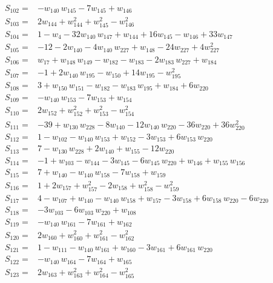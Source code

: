\begin{align*}
S_{102}={}& -w_{140}\,w_{145} - 7w_{145} + w_{146} \\[2pt]
S_{103}={}& 2w_{144} + w_{144}^{2} + w_{145}^{2} - w_{146}^{2} \\[2pt]
S_{104}={}& 1 - w_{4} - 32w_{140}\,w_{147} + w_{144} + 16w_{145} - w_{146} + 33w_{147} \\[2pt]
S_{105}={}& -12 - 2w_{140} - 4w_{140}\,w_{227} + w_{148} - 24w_{227} + 4w_{227}^{2} \\[2pt]
S_{106}={}& w_{17} + w_{148}\,w_{149} - w_{182} - w_{183} - 2w_{183}\,w_{227} + w_{184} \\[2pt]
S_{107}={}& -1 + 2w_{140}\,w_{195} - w_{150} + 14w_{195} - w_{195}^{2} \\[2pt]
S_{108}={}& 3 + w_{150}\,w_{151} - w_{182} - w_{183}\,w_{195} + w_{184} + 6w_{220} \\[2pt]
S_{109}={}& -w_{140}\,w_{153} - 7w_{153} + w_{154} \\[2pt]
S_{110}={}& 2w_{152} + w_{152}^{2} + w_{153}^{2} - w_{154}^{2} \\[2pt]
S_{111}={}& -39 + w_{130}\,w_{228} - 8w_{140} - 12w_{140}\,w_{220} - 36w_{220} + 36w_{220}^{2} \\[2pt]
S_{112}={}& 1 - w_{102} - w_{140}\,w_{153} + w_{152} - 3w_{153} + 6w_{153}\,w_{220} \\[2pt]
S_{113}={}& 7 - w_{130}\,w_{228} + 2w_{140} + w_{155} - 12w_{220} \\[2pt]
S_{114}={}& -1 + w_{103} - w_{144} - 3w_{145} - 6w_{145}\,w_{220} + w_{146} + w_{155}\,w_{156} \\[2pt]
S_{115}={}& 7 + w_{140} - w_{140}\,w_{158} - 7w_{158} + w_{159} \\[2pt]
S_{116}={}& 1 + 2w_{157} + w_{157}^{2} - 2w_{158} + w_{158}^{2} - w_{159}^{2} \\[2pt]
S_{117}={}& 4 - w_{107} + w_{140} - w_{140}\,w_{158} + w_{157} - 3w_{158} + 6w_{158}\,w_{220} - 6w_{220} \\[2pt]
S_{118}={}& -3w_{103} - 6w_{103}\,w_{220} + w_{108} \\[2pt]
S_{119}={}& -w_{140}\,w_{161} - 7w_{161} + w_{162} \\[2pt]
S_{120}={}& 2w_{160} + w_{160}^{2} + w_{161}^{2} - w_{162}^{2} \\[2pt]
S_{121}={}& 1 - w_{111} - w_{140}\,w_{161} + w_{160} - 3w_{161} + 6w_{161}\,w_{220} \\[2pt]
S_{122}={}& -w_{140}\,w_{164} - 7w_{164} + w_{165} \\[2pt]
S_{123}={}& 2w_{163} + w_{163}^{2} + w_{164}^{2} - w_{165}^{2} \\[2pt]

\end{align*}
